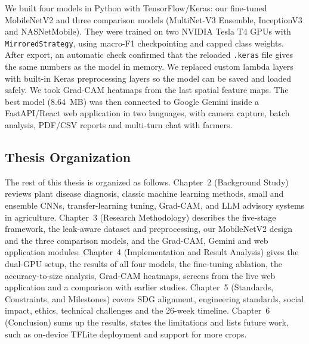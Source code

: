 We built four models in Python with TensorFlow/Keras: our fine-tuned MobileNetV2 and three comparison models (MultiNet-V3 Ensemble, InceptionV3 and NASNetMobile). They were trained on two NVIDIA Tesla T4 GPUs with \texttt{MirroredStrategy}, using macro-F1 checkpointing and capped class weights. After export, an automatic check confirmed that the reloaded \texttt{.keras} file gives the same numbers as the model in memory. We replaced custom lambda layers with built-in Keras preprocessing layers so the model can be saved and loaded safely. We took Grad-CAM heatmaps from the last spatial feature maps. The best model (8.64~MB) was then connected to Google Gemini inside a FastAPI/React web application in two languages, with camera capture, batch analysis, PDF/CSV reports and multi-turn chat with farmers.

\subsection{Thesis Organization}
The rest of this thesis is organized as follows. Chapter~2 (Background Study) reviews plant disease diagnosis, classic machine learning methods, small and ensemble CNNs, transfer-learning tuning, Grad-CAM, and LLM advisory systems in agriculture. Chapter~3 (Research Methodology) describes the five-stage framework, the leak-aware dataset and preprocessing, our MobileNetV2 design and the three comparison models, and the Grad-CAM, Gemini and web application modules. Chapter~4 (Implementation and Result Analysis) gives the dual-GPU setup, the results of all four models, the fine-tuning ablation, the accuracy-to-size analysis, Grad-CAM heatmaps, screens from the live web application and a comparison with earlier studies. Chapter~5 (Standards, Constraints, and Milestones) covers SDG alignment, engineering standards, social impact, ethics, technical challenges and the 26-week timeline. Chapter~6 (Conclusion) sums up the results, states the limitations and lists future work, such as on-device TFLite deployment and support for more crops.
